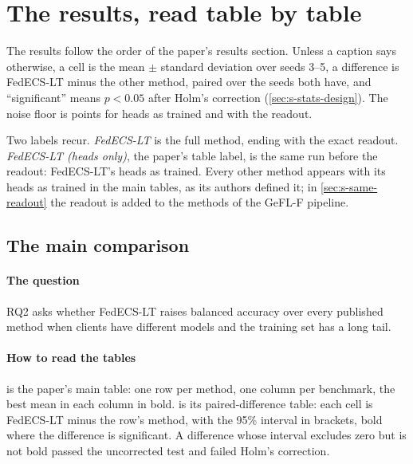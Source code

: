 \section{The results, read table by table}\label{ch:results}

The results follow the order of the paper's results section. Unless a caption says otherwise, a cell is the mean
$\pm$ standard deviation over seeds 3--5, a difference is FedECS-LT minus the other method, paired over the seeds both
have, and ``significant'' means $p<0.05$ after Holm's correction (\cref{sec:s-stats-design}). The noise floor is
 points for heads as trained and  with the readout.

Two labels recur. \emph{FedECS-LT} is the full method, ending with the exact readout. \emph{FedECS-LT (heads only)},
the paper's table label, is the same run before the readout: FedECS-LT's heads as trained. Every other method appears
with its heads as trained in the main tables, as its authors defined it; in \cref{sec:s-same-readout} the readout is
added to the methods of the GeFL-F pipeline.

\subsection{The main comparison}\label{sec:s-main}

\paragraph{The question} RQ2 asks whether FedECS-LT raises balanced accuracy over every published method when clients
have different models and the training set has a long tail.

\paragraph{How to read the tables}  is the paper's main table: one row per method, one column per
benchmark, the best mean in each column in bold.  is its paired-difference table: each cell is
FedECS-LT minus the row's method, with the 95\% interval in brackets, bold where the difference is significant. A
difference whose interval excludes zero but is not bold passed the uncorrected test and failed Holm's correction.

\begin{table}[t]
\centering\small
\caption{Balanced accuracy (\%), the paper's main table. Look at the first three rows: the full method, its heads as
trained, and GeFL-F; then at the strongest other method in each column.}
\label{tab:s-main}
\end{table}

